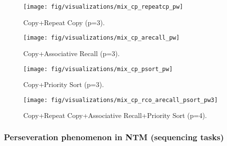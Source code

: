 \documentclass[english]{article}
\begin{document}
\begin{figure}[H]
\begin{centering}
\texttt{[image: fig/visualizations/mix\_cp\_repeatcp\_pw]}
\par\end{centering}
\caption{Copy+Repeat Copy (p=3).}
\end{figure}
\begin{figure}[H]
\begin{centering}
\texttt{[image: fig/visualizations/mix\_cp\_arecall\_pw]}
\par\end{centering}
\caption{Copy+Associative Recall (p=3).}
\end{figure}
\begin{figure}[H]
\begin{centering}
\texttt{[image: fig/visualizations/mix\_cp\_psort\_pw]}
\par\end{centering}
\caption{Copy+Priority Sort (p=3).}
\end{figure}
\begin{figure}[H]
\begin{centering}
\texttt{[image: fig/visualizations/mix\_cp\_rco\_arecall\_psort\_pw3]}
\par\end{centering}
\caption{Copy+Repeat Copy+Associative Recall+Priority Sort (p=4).}
\end{figure}

\subsubsection{Perseveration phenomenon in NTM (sequencing tasks)\label{subsec:Perseveration-phenomenon-in}}
\end{document}

